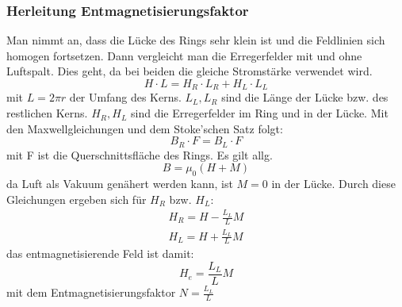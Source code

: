         \subsubsection*{Herleitung Entmagnetisierungsfaktor}
            Man nimmt an, dass die Lücke des Rings sehr klein ist und die Feldlinien sich homogen
            fortsetzen. Dann vergleicht man die Erregerfelder mit und ohne Luftspalt. Dies geht, da
            bei beiden die gleiche Stromstärke verwendet wird.
            \begin{equation}
                H \cdot L = H_R \cdot L_R + H_L \cdot L_L
            \end{equation}
            mit $L = 2 \pi r$ der Umfang des Kerns. $L_L, L_R$ sind die Länge der Lücke bzw. des restlichen Kerns.
            $H_R, H_L$ sind die Erregerfelder im Ring und in der Lücke.
            Mit den Maxwellgleichungen und dem Stoke'schen Satz folgt:
            \begin{equation}
                B_R \cdot F = B_L \cdot F
            \end{equation}
            mit F ist die Querschnittsfläche des Rings. Es gilt allg.
            \begin{equation}
                B = \mu_0 (H + M)
            \end{equation}
            da Luft als Vakuum genähert werden kann, ist $M=0$ in der Lücke.
            Durch diese Gleichungen ergeben sich für $H_R$ bzw. $H_L$:
            \begin{align*}
                H_R = H - \frac{L_L}{L} M\\
                H_L = H + \frac{L_L}{L} M
            \end{align*}
            das entmagnetisierende Feld ist damit:
            \begin{equation}
                H_e = \frac{L_L}{L} M
            \end{equation}
            mit dem Entmagnetisierungsfaktor $N = \frac{L_L}{L}$
